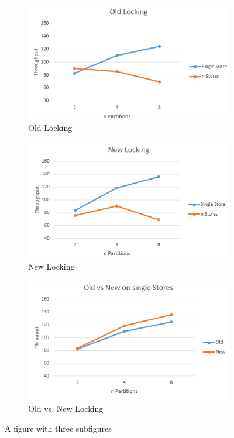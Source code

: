 \begin{figure}[t]
    \centering
    \begin{subfigure}{.5\textwidth}
      \centering
      \includegraphics[width=.7\linewidth]{Figures/old_locking.PNG}
      \caption{Old Locking}
      \label{fig:oldlock}
    \end{subfigure}%
    \begin{subfigure}{.5\textwidth}
      \centering
      \includegraphics[width=.7\linewidth]{Figures/new_locking.PNG}
      \caption{New Locking}
      \label{fig:newlock}
    \end{subfigure}
    \begin{subfigure}{.7\textwidth}
        \centering
        \includegraphics[width=.7\linewidth]{Figures/old_vs_new.PNG}
        \caption{Old vs. New Locking}
        \label{fig:oldandnewlock}
      \end{subfigure}
    \caption{A figure with three subfigures}
    \label{fig:lock_comp}
\end{figure}

